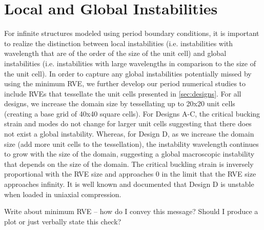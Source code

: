 \documentclass[10pt,twoside]{fernandes_supp}
\newcommand{\mf}[1]{\colorbox{blue!10}{\color{color3}#1}}
\begin{document}
\section{Local and Global Instabilities}
For infinite structures modeled using period boundary conditions, it is important to realize the distinction between local instabilities (i.e. instabilities with wavelength that are of the order of the size of the unit cell) and global instabilities (i.e. instabilities with large wavelengths in comparison to the size of the unit cell). In order to capture any global instabilities potentially missed by using the minimum RVE, we further develop our period numerical studies to include RVEs that tessellate the unit cells presented in \cref{sec:designs}. For all designs, we increase the domain size by tessellating up to 20x20 unit cells (creating a base grid of 40x40 square cells). For Designs A-C, the critical bucking strain and modes do not change for larger unit cells suggesting that there does not exist a global instability. Whereas, for Design D, as we increase the domain size (add more unit cells to the tessellation), the instability  wavelength continues to grow with the size of the domain, suggesting a global macroscopic instability that depends on the size of the domain. The critical buckling strain is inversely proportional with the RVE size and approaches 0 in the limit that the RVE size approaches infinity. It is well known and documented that Design D is unstable when loaded in uniaxial compression. 

\mf{Write about minimum RVE -- how do I convey this message? Should I produce a plot or just verbally state this check?}

\nocite{aizenberg2005}
\nocite{deshpande2001}
\nocite{miserez2008}
\nocite{weaver2010}



% 
\end{document}
